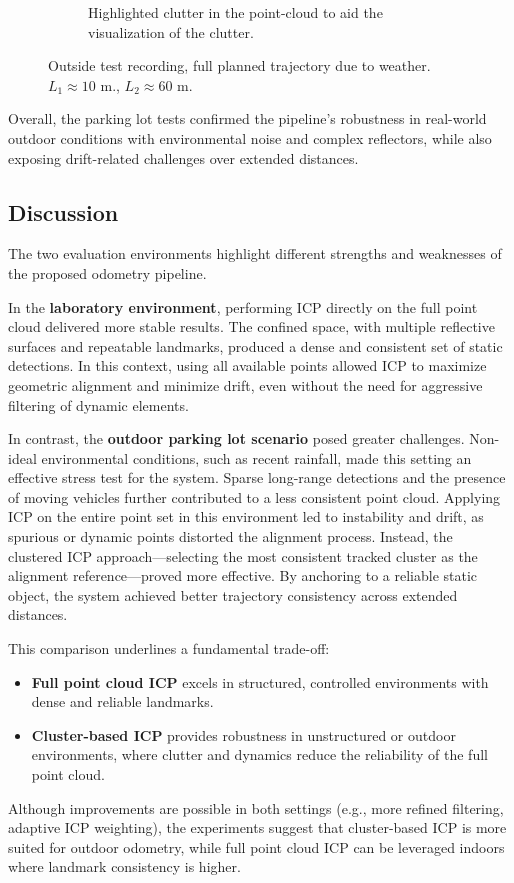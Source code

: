 \begin{figure}[!htbp]
\begin{subfigure}{0.48\linewidth}
        \caption{Highlighted clutter in the point-cloud to aid the visualization of the clutter.}
        \label{fig:highlightedClutter}
    \end{subfigure}
    \caption{Outside test recording, full planned trajectory due to weather. $L_1 \approx 10$ m., $L_2 \approx 60$ m. }
    \label{fig:outsideClutterRecording}
\end{figure}

Overall, the parking lot tests confirmed the pipeline's robustness in real-world outdoor conditions with environmental noise and complex reflectors, while also exposing drift-related challenges over extended distances.

\subsection{Discussion}
The two evaluation environments highlight different strengths and weaknesses of the proposed odometry pipeline.  

In the \textbf{laboratory environment}, performing ICP directly on the full point cloud delivered more stable results.  
The confined space, with multiple reflective surfaces and repeatable landmarks, produced a dense and consistent set of static detections.  
In this context, using all available points allowed ICP to maximize geometric alignment and minimize drift, even without the need for aggressive filtering of dynamic elements.  

In contrast, the \textbf{outdoor parking lot scenario} posed greater challenges.  
Non-ideal environmental conditions, such as recent rainfall, made this setting an effective stress test for the system.  
Sparse long-range detections and the presence of moving vehicles further contributed to a less consistent point cloud.  
Applying ICP on the entire point set in this environment led to instability and drift, as spurious or dynamic points distorted the alignment process.  
Instead, the clustered ICP approach—selecting the most consistent tracked cluster as the alignment reference—proved more effective.  
By anchoring to a reliable static object, the system achieved better trajectory consistency across extended distances.  

This comparison underlines a fundamental trade-off:
\begin{itemize}
    \item \textbf{Full point cloud ICP} excels in structured, controlled environments with dense and reliable landmarks.
    \item \textbf{Cluster-based ICP} provides robustness in unstructured or outdoor environments, where clutter and dynamics reduce the reliability of the full point cloud.
\end{itemize}

Although improvements are possible in both settings (e.g., more refined filtering, adaptive ICP weighting), the experiments suggest that cluster-based ICP is more suited for outdoor odometry, while full point cloud ICP can be leveraged indoors where landmark consistency is higher.
